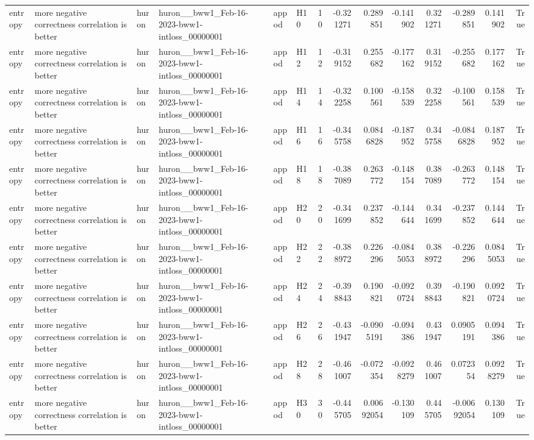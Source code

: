 \begin{longtable}{llllllrrrrrrrr}
entropy & more negative correctness correlation is better & huron & huron\_\_bww1\_Feb-16-2023-bww1-intloss\_00000001 & appod & H10 & 10 & -0.321271 & 0.289851 & -0.141902 & 0.321271 & -0.289851 & 0.141902 & True \\
entropy & more negative correctness correlation is better & huron & huron\_\_bww1\_Feb-16-2023-bww1-intloss\_00000001 & appod & H12 & 12 & -0.319152 & 0.255682 & -0.177162 & 0.319152 & -0.255682 & 0.177162 & True \\
entropy & more negative correctness correlation is better & huron & huron\_\_bww1\_Feb-16-2023-bww1-intloss\_00000001 & appod & H14 & 14 & -0.322258 & 0.100561 & -0.158539 & 0.322258 & -0.100561 & 0.158539 & True \\
entropy & more negative correctness correlation is better & huron & huron\_\_bww1\_Feb-16-2023-bww1-intloss\_00000001 & appod & H16 & 16 & -0.345758 & 0.0846828 & -0.187952 & 0.345758 & -0.0846828 & 0.187952 & True \\
entropy & more negative correctness correlation is better & huron & huron\_\_bww1\_Feb-16-2023-bww1-intloss\_00000001 & appod & H18 & 18 & -0.387089 & 0.263772 & -0.148154 & 0.387089 & -0.263772 & 0.148154 & True \\
entropy & more negative correctness correlation is better & huron & huron\_\_bww1\_Feb-16-2023-bww1-intloss\_00000001 & appod & H20 & 20 & -0.341699 & 0.237852 & -0.144644 & 0.341699 & -0.237852 & 0.144644 & True \\
entropy & more negative correctness correlation is better & huron & huron\_\_bww1\_Feb-16-2023-bww1-intloss\_00000001 & appod & H22 & 22 & -0.388972 & 0.226296 & -0.0845053 & 0.388972 & -0.226296 & 0.0845053 & True \\
entropy & more negative correctness correlation is better & huron & huron\_\_bww1\_Feb-16-2023-bww1-intloss\_00000001 & appod & H24 & 24 & -0.398843 & 0.190821 & -0.0920724 & 0.398843 & -0.190821 & 0.0920724 & True \\
entropy & more negative correctness correlation is better & huron & huron\_\_bww1\_Feb-16-2023-bww1-intloss\_00000001 & appod & H26 & 26 & -0.431947 & -0.0905191 & -0.094386 & 0.431947 & 0.0905191 & 0.094386 & True \\
entropy & more negative correctness correlation is better & huron & huron\_\_bww1\_Feb-16-2023-bww1-intloss\_00000001 & appod & H28 & 28 & -0.461007 & -0.072354 & -0.0928279 & 0.461007 & 0.072354 & 0.0928279 & True \\
entropy & more negative correctness correlation is better & huron & huron\_\_bww1\_Feb-16-2023-bww1-intloss\_00000001 & appod & H30 & 30 & -0.445705 & 0.00692054 & -0.130109 & 0.445705 & -0.00692054 & 0.130109 & True \\

\end{longtable}
